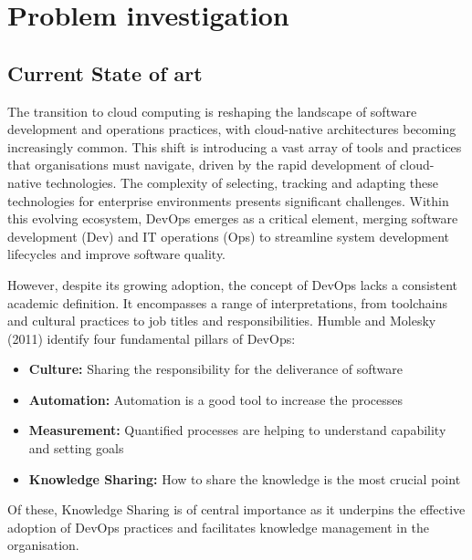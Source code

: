 
\chapter{Problem investigation}

\label{Chapter2} %


\section{Current State of art}

The transition to cloud computing is reshaping the landscape of software development and operations practices, with cloud-native architectures becoming increasingly common. This shift is introducing a vast array of tools and practices that organisations must navigate, driven by the rapid development of cloud-native technologies. The complexity of selecting, tracking and adapting these technologies for enterprise environments presents significant challenges. Within this evolving ecosystem, DevOps emerges as a critical element, merging software development (Dev) and IT operations (Ops) to streamline system development lifecycles and improve software quality.

However, despite its growing adoption, the concept of DevOps lacks a consistent academic definition. It encompasses a range of interpretations, from toolchains and cultural practices to job titles and responsibilities. Humble and Molesky (2011) identify four fundamental pillars of DevOps:

\begin{itemize}
    \item \textbf{Culture:} Sharing the responsibility for the deliverance of software
    \item \textbf{Automation:} Automation is a good tool to increase the processes
    \item \textbf{Measurement:} Quantified processes are helping to understand capability and setting goals
    \item \textbf{Knowledge Sharing:} How to share the knowledge is the most crucial point
\end{itemize}

Of these, Knowledge Sharing is of central importance as it underpins the effective adoption of DevOps practices and facilitates knowledge management in the organisation. \cite{HumbleMolesky2011}

